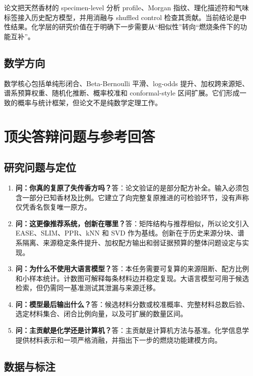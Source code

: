 \documentclass[UTF8,11pt,openany,fontset=none]{ctexbook}
\begin{document}
论文把天然香材的 specimen-level 分析 profile、Morgan 指纹、理化描述符和气味标签接入历史配方模型，并用消融与 shuffled control 检查其贡献。当前结论是中性结果。化学层的研究价值在于明确下一步需要从“相似性”转向“燃烧条件下的功能互补”。

\section{数学方向}

数学核心包括单纯形闭合、Beta-Bernoulli 平滑、log-odds 提升、加权跨来源矩、谱系预算权重、随机化推断、概率校准和 conformal-style 区间扩展。它们形成一致的概率与统计框架，但论文不是纯数学定理工作。

\chapter{顶尖答辩问题与参考回答}

\section{研究问题与定位}

\begin{enumerate}
\item \textbf{问：你真的复原了失传香方吗？}\quad 答：论文验证的是部分配方补全。输入必须包含一部分已知香材及比例。它建立了向完整复原推进的可检验环节，没有声称仅凭香名恢复唯一原方。
\item \textbf{问：这更像推荐系统，创新在哪里？}\quad 答：矩阵结构与推荐相似，所以论文引入 EASE、SLIM、PPR、kNN 和 SVD 作为基线。创新在于历史来源分块、谱系隔离、来源稳定条件提升、加权配方输出和弱证据预算的整体问题设定与实现。
\item \textbf{问：为什么不使用大语言模型？}\quad 答：本任务需要可复算的来源阻断、配方比例和小样本统计。计数图可解释每条材料边并稳定复现。大语言模型可用于候选检索，但仍需同一基准测试其泄漏与来源迁移。
\item \textbf{问：模型最后输出什么？}\quad 答：候选材料分数或校准概率、完整材料总数后验、选定材料集合、闭合比例向量，以及可扩展的数量区间。
\item \textbf{问：主贡献是化学还是计算机？}\quad 答：主贡献是计算机方法与基准。化学信息学提供材料表示和一项严格消融，并指出下一步的燃烧功能建模方向。
\end{enumerate}

\section{数据与标注}
\end{document}
